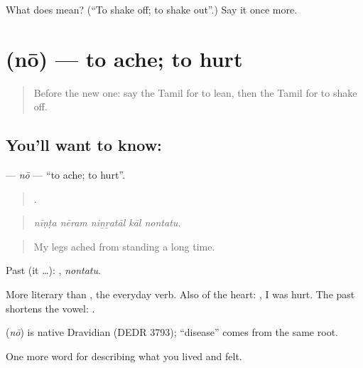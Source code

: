 \begin{tcolorbox}[breakable,colback=teal!4,colframe=teal!35!black,title={Before you move on}]
What does  mean? (\textquotedblleft{}To shake off; to shake out\textquotedblright{}.) Say it once more.
\end{tcolorbox}
\section[\texorpdfstring{\ta{நோ} (nō)}{நோ (nō)}]{ (nō) — to ache; to hurt}

\label{lesson:TA-C490-no}



\begin{quote}
Before the new one: say the Tamil for to lean, then the Tamil for to shake off.
\end{quote}

\subsection*{You'll want to know: }
\textbf{} — \emph{nō} — \textquotedblleft{}to ache; to hurt\textquotedblright{}.

\begin{quote}
    .
\end{quote}

\begin{quote}
\emph{nīṇṭa nēram niṉṟatāl kāl nontatu.}
\end{quote}

\begin{quote}
My legs ached from standing a long time.
\end{quote}

Past (it …): , \emph{nontatu}.

More literary than , the everyday verb. Also of the heart:  , I was hurt. The past shortens the vowel: .

\begin{cousinweb}
\textbf{} (\emph{nō}) is native Dravidian (DEDR 3793);  \textquotedblleft{}disease\textquotedblright{} comes from the same root.
\end{cousinweb}

\begin{grammarlens}[title={What you've built}]
One more word for describing what you lived and felt.
\end{grammarlens}

